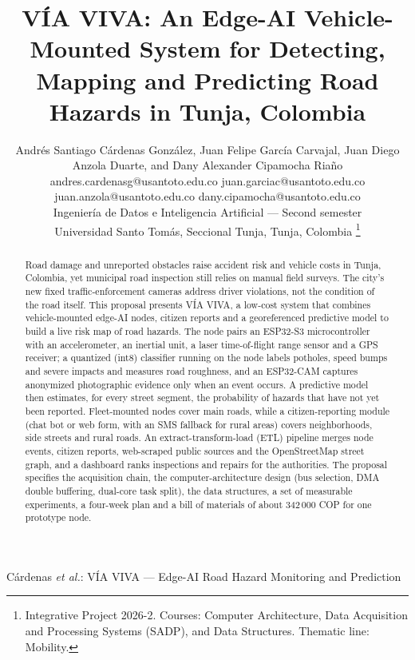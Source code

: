 \documentclass[journal,10pt]{IEEEtran}
\begin{document}
\title{V\'IA VIVA: An Edge-AI Vehicle-Mounted System for Detecting, Mapping and Predicting Road Hazards in Tunja, Colombia}

\author{Andr\'es Santiago C\'ardenas Gonz\'alez, Juan Felipe Garc\'ia Carvajal, Juan Diego Anzola Duarte, and Dany Alexander Cipamocha Ria\~no\\[0.3em]
\footnotesize andres.cardenasg@usantoto.edu.co \quad juan.garciac@usantoto.edu.co \quad juan.anzola@usantoto.edu.co \quad dany.cipamocha@usantoto.edu.co\\[0.15em]
\small Ingenier\'ia de Datos e Inteligencia Artificial --- Second semester\\
\small Universidad Santo Tom\'as, Seccional Tunja, Tunja, Colombia%
\thanks{Integrative Project 2026-2. Courses: Computer Architecture, Data Acquisition and Processing Systems (SADP), and Data Structures. Thematic line: Mobility.}}

%
{C\'ardenas \MakeLowercase{\textit{et al.}}: V\'IA VIVA --- Edge-AI Road Hazard Monitoring and Prediction}

\maketitle

\begin{abstract}
Road damage and unreported obstacles raise accident risk and vehicle costs in Tunja, Colombia, yet municipal road inspection still relies on manual field surveys. The city's new fixed traffic-enforcement cameras address driver violations, not the condition of the road itself. This proposal presents V\'IA VIVA, a low-cost system that combines vehicle-mounted edge-AI nodes, citizen reports and a georeferenced predictive model to build a live risk map of road hazards. The node pairs an ESP32-S3 microcontroller with an accelerometer, an inertial unit, a laser time-of-flight range sensor and a GPS receiver; a quantized (int8) classifier running on the node labels potholes, speed bumps and severe impacts and measures road roughness, and an ESP32-CAM captures anonymized photographic evidence only when an event occurs. A predictive model then estimates, for every street segment, the probability of hazards that have not yet been reported. Fleet-mounted nodes cover main roads, while a citizen-reporting module (chat bot or web form, with an SMS fallback for rural areas) covers neighborhoods, side streets and rural roads. An extract-transform-load (ETL) pipeline merges node events, citizen reports, web-scraped public sources and the OpenStreetMap street graph, and a dashboard ranks inspections and repairs for the authorities. The proposal specifies the acquisition chain, the computer-architecture design (bus selection, DMA double buffering, dual-core task split), the data structures, a set of measurable experiments, a four-week plan and a bill of materials of about 342\,000 COP for one prototype node.
\end{abstract}
\end{document}
